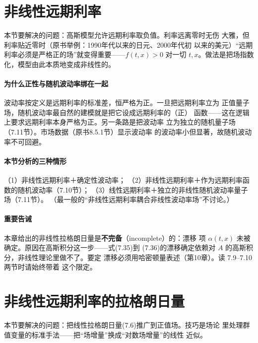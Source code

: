 \section{非线性远期利率}

本节要解决的问题：高斯模型允许远期利率取负值。利率远离零时无伤
大雅，但利率贴近零时（原书举例：1990年代以来的日元、2000年代初
以来的美元）“远期利率必须是严格正的场”就变得重要——$f(t,x)>0$
对一切 $t,x$。做法是把场指数化，模型由此本质地变成非线性的。

\paragraph{为什么正性与随机波动率绑在一起}
波动率按定义是远期利率的标准差，恒严格为正。一旦把远期利率立为
正值量子场，随机波动率最自然的建模就是把它设成远期利率的（正）
函数——这在逻辑上要求远期利率本身严格为正。另一条路是把波动率
立为独立的随机量子场（7.11节）。市场数据（原书8.5.1节）显示波动率
的波动率小但显著，故随机波动率不可回避。

\paragraph{本节分析的三种情形}
（1）非线性远期利率＋确定性波动率；
（2）非线性远期利率＋作为远期利率函数的随机波动率（7.10节）；
（3）线性远期利率＋独立的非线性随机波动率量子场（7.11节）。
（最一般的“非线性远期利率耦合非线性波动率场”不讨论。）

\paragraph{重要告诫}
本章给出的非线性拉格朗日量是\textbf{不完备}（incomplete）的：漂移
项 $\alpha(t,x)$ 未被确定。原因在高斯积分这一步——式(7.35)到
(7.36)的漂移确定依赖对 $A$ 的高斯积分，非线性理论里做不了。要定
漂移必须用哈密顿量表述（第10章）。读 7.9--7.10 两节时请始终带着
这个限定。

\section{非线性远期利率的拉格朗日量}

本节要解决的问题：把线性拉格朗日量(7.6)推广到正值场。技巧是场论
里处理群值变量的标准手法——把“场增量”换成“对数场增量”的线性
近似。

